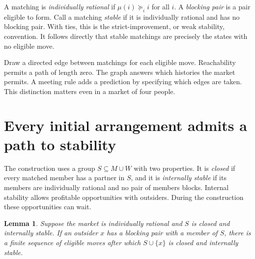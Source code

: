 \documentclass[11pt]{article}
\newtheorem{lemma}{Lemma}
\begin{document}
A matching is \emph{individually rational} if \(\mu(i)\succeq_i i\) for all \(i\). A \emph{blocking pair} is a pair eligible to form. Call a matching \emph{stable} if it is individually rational and has no blocking pair. With ties, this is the strict-improvement, or weak stability, convention. It follows directly that stable matchings are precisely the states with no eligible move.

Draw a directed edge between matchings for each eligible move. Reachability permits a path of length zero. The graph answers which histories the market permits. A meeting rule adds a prediction by specifying which edges are taken. This distinction matters even in a market of four people.

\section{Every initial arrangement admits a path to stability}

The construction uses a group \(S\subseteq M\cup W\) with two properties. It is \emph{closed} if every matched member has a partner in \(S\), and it is \emph{internally stable} if its members are individually rational and no pair of members blocks. Internal stability allows profitable opportunities with outsiders. During the construction these opportunities can wait.

\begin{lemma}
Suppose the market is individually rational and \(S\) is closed and internally stable. If an outsider \(x\) has a blocking pair with a member of \(S\), there is a finite sequence of eligible moves after which \(S\cup\{x\}\) is closed and internally stable.
\end{lemma}
\end{document}
